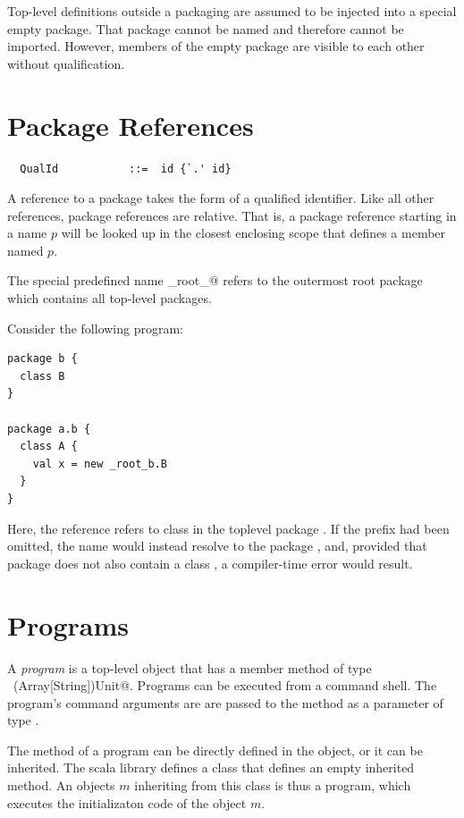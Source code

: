 Top-level definitions outside a packaging are assumed to be injected
into a special empty package. That package cannot be named and
therefore cannot be imported. However, members of the empty package
are visible to each other without qualification.

\section{Package References}

\syntax\begin{lstlisting}
  QualId           ::=  id {`.' id}
\end{lstlisting}
A reference to a package takes the form of a qualified identifier.
Like all other references, package references are relative. That is, 
a package reference starting in a name $p$ will be looked up in the
closest enclosing scope that defines a member named $p$.

The special predefined name \lstinline@_root_@  refers to the
outermost root package which contains all top-level packages.  

\example\label{ex:package-ids}
Consider the following program:
\begin{lstlisting}
package b {
  class B 
}

package a.b {
  class A {
    val x = new _root_b.B
  }
}
\end{lstlisting}  
Here, the reference  refers to class  in the
toplevel package . If the  prefix had been
omitted, the name  would instead resolve to the package
, and, provided that package does not also
contain a class , a compiler-time error would result.

\section{Programs}

A {\em program} is a top-level object that has a member method
 of type ~\lstinline@(Array[String])Unit@. Programs can be
executed from a command shell. The program's command arguments are are
passed to the  method as a parameter of type
.

The  method of a program can be directly defined in the
object, or it can be inherited. The scala library defines a class
 that defines an empty inherited  method.
An objects $m$ inheriting from this class is thus a program, 
which executes the initializaton code of the object $m$.

